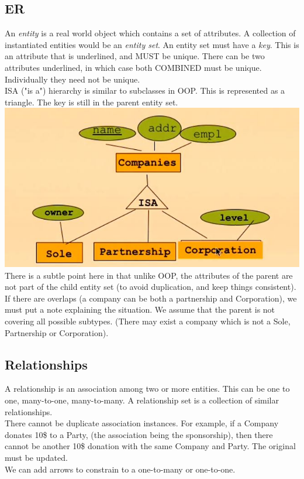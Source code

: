 \documentclass[12pt]{article}
\theoremstyle{definition}
\begin{document}
\subsection{ER}
An \textit{entity} is a real world object which contains a set of attributes. A collection of instantiated entities would be an \textit{entity set}. An entity set must have a \textit{key}. This is an attribute that is underlined, and MUST be unique. There can be two attributes underlined, in which case both COMBINED must be unique. Individually they need not be unique. 
\\ \linebreak
ISA ("is a") hierarchy is similar to subclasses in OOP. This is represented as a triangle. The key is still in the parent entity set. 
\\ \includegraphics{isa}\\
There is a subtle point here in that unlike OOP, the attributes of the parent are not part of the child entity set (to avoid duplication, and keep things consistent).
\\ \linebreak
 If there are overlaps (a company can be both a partnership and Corporation), we must put a note explaining the situation. We assume that the parent is not covering all possible subtypes. (There may exist a company which is not a Sole, Partnership or Corporation).

\subsection{Relationships}
A relationship is an association among two or more entities. This can be one to one, many-to-one, many-to-many. A relationship set is a collection of similar relationships.
\\ \linebreak
There cannot be duplicate association instances. For example, if a Company donates 10\$ to a Party, (the association being the sponsorship), then there cannot be another 10\$ donation with the same Company and Party. The original must be updated.
\\ \linebreak
We can add arrows to constrain to a one-to-many or one-to-one. 
\end{document}
